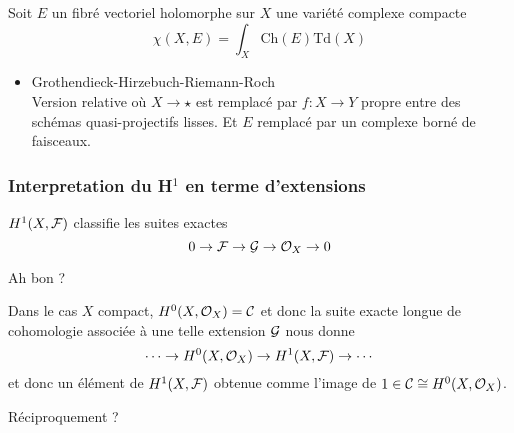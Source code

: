 \documentclass[12pt,makeidx]{amsart}
\begin{document}
Soit $E$ un fibré vectoriel holomorphe sur $X$ une variété complexe compacte
\begin{equation}\label{HRR}
\chi(X,E) = \int_X \text{Ch}(E)\text{Td}(X)
\end{equation}
\begin{itemize}

\item Grothendieck-Hirzebuch-Riemann-Roch\\
\label{sec-1-6-1-1}%
Version relative où $X \to \star$ est remplacé par $f: X \to Y$ propre entre des schémas quasi-projectifs lisses. Et $E$ remplacé par un complexe borné de faisceaux.
\end{itemize} %
\subsubsection{Interpretation du H$^1$ en terme d'extensions}
\label{sec-1-6-2}

$H^1(X,\mathcal{F})$ classifie les suites exactes
\begin{equation}
0 \rightarrow \mathcal{F} \rightarrow \mathcal{G} \rightarrow \mathcal{O}_X \rightarrow 0
\end{equation}

Ah bon ?

Dans le cas $X$ compact, $H^0(X,\mathcal{O}_X) = \mathcal{C}$ et donc la suite exacte longue de cohomologie associée à une telle extension $\mathcal{G}$ nous donne
\begin{equation}
\cdots \rightarrow H^0(X,\mathcal{O}_X) \rightarrow H^1(X,\mathcal{F}) \rightarrow \cdots
\end{equation}
et donc un élément de $H^1(X,\mathcal{F})$ obtenue comme l'image de $1 \in \mathcal{C} \cong H^0(X,\mathcal{O}_X)$.

Réciproquement ?
\end{document}
